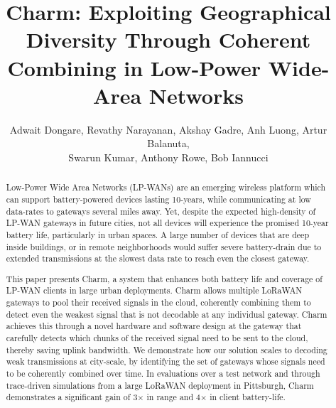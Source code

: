 \documentclass[sigconf]{acmart}
\title{Charm: Exploiting Geographical Diversity Through Coherent Combining in Low-Power Wide-Area Networks}
\author{Adwait Dongare,
		Revathy Narayanan,
		Akshay Gadre,
		Anh Luong,
		Artur Balanuta,\\
		Swarun Kumar,
		Anthony Rowe,
		Bob Iannucci}
\affiliation{%
 \institution{Carnegie Mellon University}
 \department{Electrical and Computer Engineering}
 \city{Pittsburgh} 
 \state{Pennsylvania} 
}
\begin{document}
\begin{abstract}



Low-Power Wide Area Networks (LP-WANs) are an emerging wireless platform which can support battery-powered devices lasting 10-years, while communicating at low data-rates to gateways several miles away. Yet, despite the expected high-density of LP-WAN gateways in future cities, not all devices will experience the promised 10-year battery life, particularly in urban spaces. A
large number of devices that are deep inside buildings, or in remote neighborhoods would suffer severe battery-drain due to extended transmissions at the slowest data rate to reach even the closest gateway.

This paper presents Charm, a system that enhances both battery life and coverage of LP-WAN clients in large urban deployments. Charm allows multiple LoRaWAN gateways to pool their received signals in the cloud, coherently combining them to detect even the weakest signal that is not decodable at any individual gateway. Charm achieves this through a novel hardware and software design at the gateway that carefully detects which chunks of the received signal need to be sent to the cloud, thereby saving uplink bandwidth. We demonstrate how our solution scales to decoding weak transmissions at
city-scale, by identifying the set of gateways whose signals need to be coherently combined over time. In evaluations over a test network and through trace-driven simulations from a large LoRaWAN deployment in Pittsburgh, Charm demonstrates a significant gain of 3$\times$ in range and 4$\times$ in client battery-life.


\end{abstract}
\end{document}
